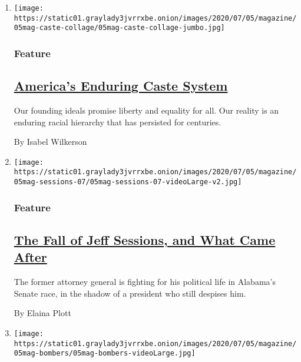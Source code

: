 \begin{enumerate}
\def\labelenumi{\arabic{enumi}.}
\item
  \texttt{[image: https://static01.graylady3jvrrxbe.onion/images/2020/07/05/magazine/05mag-caste-collage/05mag-caste-collage-jumbo.jpg]}

  \hypertarget{feature}{%
  \subsubsection{Feature}\label{feature}}

  \hypertarget{americas-enduring-caste-system}{%
  \subsection{\texorpdfstring{\href{/2020/07/01/magazine/isabel-wilkerson-caste.html}{America's
  Enduring Caste
  System}}{America's Enduring Caste System}}\label{americas-enduring-caste-system}}

  Our founding ideals promise liberty and equality for all. Our reality
  is an enduring racial hierarchy that has persisted for centuries.

  By Isabel Wilkerson
\item
  \texttt{[image: https://static01.graylady3jvrrxbe.onion/images/2020/07/05/magazine/05mag-sessions-07/05mag-sessions-07-videoLarge-v2.jpg]}

  \hypertarget{feature-1}{%
  \subsubsection{Feature}\label{feature-1}}

  \hypertarget{the-fall-of-jeff-sessions-and-what-came-after}{%
  \subsection{\texorpdfstring{\href{/2020/06/30/magazine/jeff-sessions.html}{The
  Fall of Jeff Sessions, and What Came
  After}}{The Fall of Jeff Sessions, and What Came After}}\label{the-fall-of-jeff-sessions-and-what-came-after}}

  The former attorney general is fighting for his political life in
  Alabama's Senate race, in the shadow of a president who still despises
  him.

  By Elaina Plott
\item
  \texttt{[image: https://static01.graylady3jvrrxbe.onion/images/2020/07/05/magazine/05mag-bombers/05mag-bombers-videoLarge.jpg]}


\end{enumerate}
